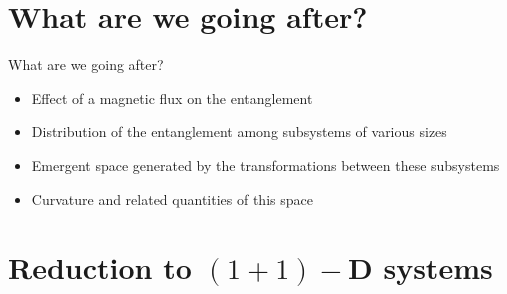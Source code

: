 \documentclass[11pt,aspectratio=169]{beamer}
\begin{document}
\section{What are we going after?}

\begin{frame}{What are we going after?}
	\begin{itemize}
		\item Effect of a magnetic flux on the entanglement\\[20pt]
		\item Distribution of the entanglement among subsystems of various sizes\\[20pt]
		\item Emergent space generated by the transformations between these subsystems\\[20pt]
		\item Curvature and related quantities of this space
	\end{itemize}

\end{frame}

\section{Reduction to \((1+1)-\)D systems}
\end{document}
